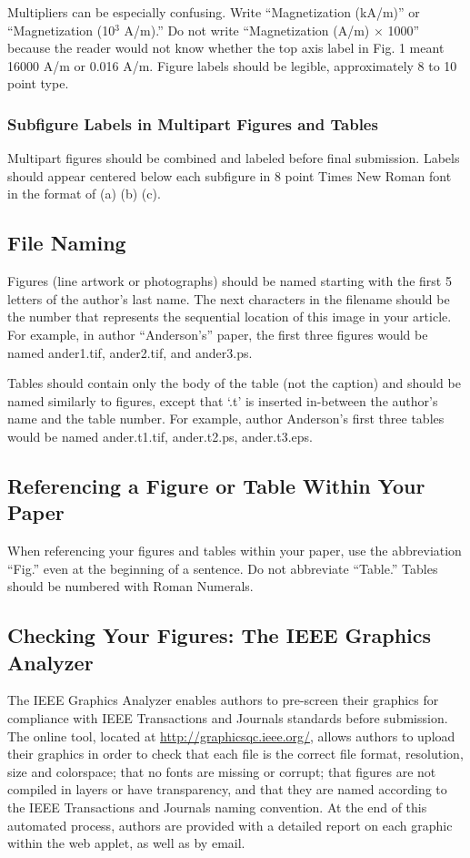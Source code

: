 \documentclass[journal]{IEEEtran}
\begin{document}
Multipliers can be especially confusing. Write ``Magnetization (kA/m)'' or ``Magnetization (10$^{3}$ A/m).'' Do not write ``Magnetization (A/m)$\,\times\,$1000'' because the reader would not know whether the top axis label in Fig. 1 meant 16000 A/m or 0.016 A/m. Figure labels should be legible, approximately 8 to 10 point type.

\subsubsection{Subfigure Labels in Multipart Figures and Tables}
Multipart figures should be combined and labeled before final submission. Labels should appear centered below each subfigure in 8 point Times New Roman font in the format of (a) (b) (c). 

\subsection{File Naming}
Figures (line artwork or photographs) should be named starting with the first 5 letters of the author's last name. The next characters in the filename should be the number that represents the sequential location of this image in your article. For example, in author ``Anderson's'' paper, the first three figures would be named ander1.tif, ander2.tif, and ander3.ps.%

Tables should contain only the body of the table (not the caption) and should be named similarly to figures, except that `.t' is inserted in-between the author's name and the table number. For example, author Anderson's first three tables would be named ander.t1.tif, ander.t2.ps, ander.t3.eps.

\subsection{Referencing a Figure or Table Within Your Paper}
When referencing your figures and tables within your paper, use the abbreviation ``Fig.'' even at the beginning of a sentence. Do not abbreviate ``Table.'' Tables should be numbered with Roman Numerals.  %

\subsection{Checking Your Figures: The IEEE Graphics Analyzer}
The IEEE Graphics Analyzer enables authors to pre-screen their graphics for compliance with IEEE Transactions and Journals standards before submission. The online tool, located at
\underline{http://graphicsqc.ieee.org/}, allows authors to 
upload their graphics in order to check that each file is the correct file format, resolution, size and colorspace; that no fonts are missing or corrupt; that figures are not compiled in layers or have transparency, and that they are named according to the IEEE Transactions and Journals naming convention. At the end of this automated process, authors are provided with a detailed report on each graphic within the web applet, as well as by email. %
\end{document}
